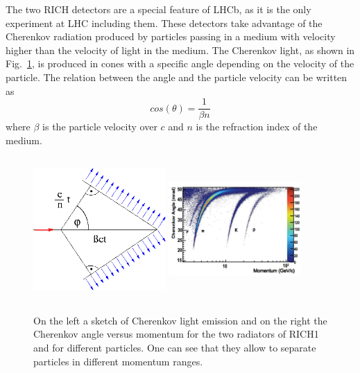 The two RICH detectors are a special feature of LHCb, as it is the only experiment at LHC including them. 
These detectors take advantage of the Cherenkov radiation produced by particles passing in a medium with velocity 
higher than the velocity of light in the medium. The Cherenkov light, as shown in Fig.~\ref{Cherenkov}, 
is produced in cones with a specific angle depending on the velocity of the particle. The relation
between the angle and the particle velocity can be written as 
%
\begin{equation}
cos(\theta) = \frac{1}{\beta n}
\end{equation}
%
where $\beta$ is the particle velocity over $c$ and $n$ is the refraction index of the medium.
%
\begin{figure}[h!]
\centering
\includegraphics[width=0.45\textwidth,height=5.5cm]{Detector/figs/detector/Cherenkov.png}
\includegraphics[width=0.45\textwidth,height=5.5cm]{Detector/figs/changle_vs_momentum.png}
\caption{On the left a sketch of Cherenkov light emission and on the right the Cherenkov
angle versus momentum for the two radiators of RICH1 and for different particles. One can see that they allow
to separate particles in different momentum ranges.}
\label{Cherenkov}
\end{figure}

